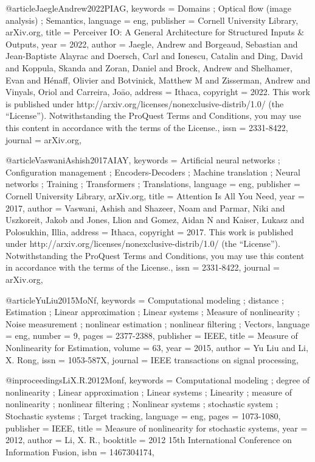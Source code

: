 @article{JaegleAndrew2022PIAG,
keywords = {Domains ; Optical flow (image analysis) ; Semantics},
language = {eng},
publisher = {Cornell University Library, arXiv.org},
title = {Perceiver IO: A General Architecture for Structured Inputs & Outputs},
year = {2022},
author = {Jaegle, Andrew and Borgeaud, Sebastian and Jean-Baptiste Alayrac and Doersch, Carl and Ionescu, Catalin and Ding, David and Koppula, Skanda and Zoran, Daniel and Brock, Andrew and Shelhamer, Evan and Hénaff, Olivier and Botvinick, Matthew M and Zisserman, Andrew and Vinyals, Oriol and Carreira, Joāo},
address = {Ithaca},
copyright = {2022. This work is published under http://arxiv.org/licenses/nonexclusive-distrib/1.0/ (the “License”). Notwithstanding the ProQuest Terms and Conditions, you may use this content in accordance with the terms of the License.},
issn = {2331-8422},
journal = {arXiv.org},
}

@article{VaswaniAshish2017AIAY,
keywords = {Artificial neural networks ; Configuration management ; Encoders-Decoders ; Machine translation ; Neural networks ; Training ; Transformers ; Translations},
language = {eng},
publisher = {Cornell University Library, arXiv.org},
title = {Attention Is All You Need},
year = {2017},
author = {Vaswani, Ashish and Shazeer, Noam and Parmar, Niki and Uszkoreit, Jakob and Jones, Llion and Gomez, Aidan N and Kaiser, Lukasz and Polosukhin, Illia},
address = {Ithaca},
copyright = {2017. This work is published under http://arxiv.org/licenses/nonexclusive-distrib/1.0/ (the “License”). Notwithstanding the ProQuest Terms and Conditions, you may use this content in accordance with the terms of the License.},
issn = {2331-8422},
journal = {arXiv.org},
}

@article{YuLiu2015MoNf,
keywords = {Computational modeling ; distance ; Estimation ; Linear approximation ; Linear systems ; Measure of nonlinearity ; Noise measurement ; nonlinear estimation ; nonlinear filtering ; Vectors},
language = {eng},
number = {9},
pages = {2377-2388},
publisher = {IEEE},
title = {Measure of Nonlinearity for Estimation},
volume = {63},
year = {2015},
author = {Yu Liu and Li, X. Rong},
issn = {1053-587X},
journal = {IEEE transactions on signal processing},
}

@inproceedings{LiX.R.2012Monf,
keywords = {Computational modeling ; degree of nonlinearity ; Linear approximation ; Linear systems ; Linearity ; measure of nonlinearity ; nonlinear filtering ; Nonlinear systems ; stochastic system ; Stochastic systems ; Target tracking},
language = {eng},
pages = {1073-1080},
publisher = {IEEE},
title = {Measure of nonlinearity for stochastic systems},
year = {2012},
author = {Li, X. R.},
booktitle = {2012 15th International Conference on Information Fusion},
isbn = {1467304174},
}

